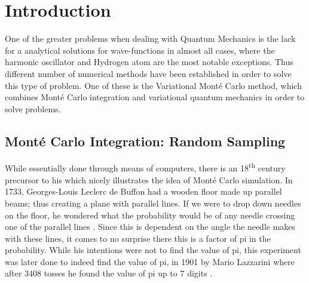 

\section{Introduction}
One of the greater problems when dealing with Quantum Mechanics is the lack for a analytical solutions for wave-functions
in almost all cases, where the harmonic oscillator and Hydrogen atom are the most notable exceptions.
Thus different number of numerical methods have been established in order to solve this type
of problem. One of these is the Variational Mont\'e Carlo method, which combines Mont\'e Carlo integration and variational
quantum mechanics in order to solve problems.


\subsection{Mont\'e Carlo Integration: Random Sampling}
\label{ch:monte}
While essentially done through means of computers, there is an 18\textsuperscript{th} century precursor to
his which nicely illustrates the idea of Mont\'e Carlo simulation. In 1733, Georges-Louis Leclerc
de Buffon had a wooden floor made up parallel beams; thus creating a plane with parallel lines.
If we were to drop down needles on the floor, he wondered what the probability would be of
any needle crossing one of the parallel lines \cite{Buffon}. Since this is dependent on the
angle the needle makes with these lines, it comes to no surprise there this is a factor of pi
in the probability. While his intentions were not to find the value of pi, this experiment
was later done to indeed find the value of pi, in 1901 by Mario Lazzarini where after 3408
tosses he found the value of pi up to 7 digits \cite{Lazzarini}.


